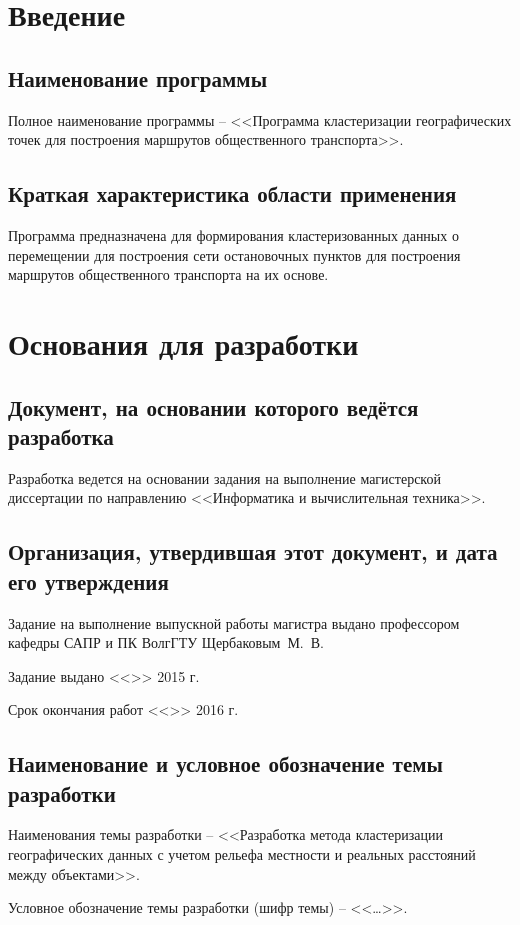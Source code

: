 \chapter{Введение}
\section{Наименование программы}
Полное наименование программы -- <<Программа кластеризации географических точек для построения маршрутов общественного транспорта>>.

\section{Краткая характеристика области применения}
Программа предназначена для формирования кластеризованных данных о перемещении для построения сети остановочных пунктов для построения маршрутов общественного транспорта на их основе.

\chapter{Основания для разработки}
\section{Документ, на основании которого ведётся разработка}
Разработка ведется на основании задания на выполнение магистерской диссертации по направлению 
<<Информатика и вычислительная техника>>.

\section{Организация, утвердившая этот документ, и дата его утверждения}
Задание на выполнение выпускной работы магистра выдано профессором кафедры САПР и ПК ВолгГТУ Щербаковым~М.~В.

Задание выдано <<\LINE{1cm}>> \LINE{5cm} 2015 г.

Срок окончания работ <<\LINE{1cm}>> \LINE{5cm} 2016 г.

\section{Наименование и условное обозначение темы разработки}
Наименования темы разработки -- <<Разработка метода кластеризации географических данных с учетом рельефа местности и реальных расстояний между объектами>>.

Условное обозначение темы разработки (шифр темы) -- <<\ldots>>.

